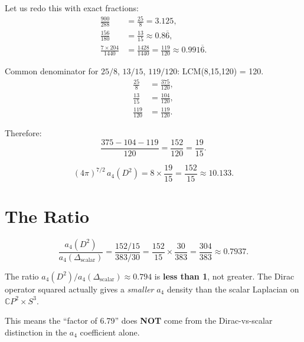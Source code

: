 \documentclass[12pt,a4paper]{article}
\theoremstyle{definition}
\begin{document}
Let us redo this with exact fractions:
\begin{align}
\frac{900}{288} &= \frac{25}{8} = 3.125, \\
\frac{156}{180} &= \frac{13}{15} \approx 0.8\overline{6}, \\
\frac{7 \times 204}{1440} &= \frac{1428}{1440} = \frac{119}{120}
  \approx 0.991\overline{6}.
\end{align}

Common denominator for $25/8$, $13/15$, $119/120$: LCM(8,15,120) = 120.
\begin{align}
\frac{25}{8} &= \frac{375}{120}, \\
\frac{13}{15} &= \frac{104}{120}, \\
\frac{119}{120} &= \frac{119}{120}.
\end{align}

Therefore:
\begin{equation}
\frac{375 - 104 - 119}{120} = \frac{152}{120} = \frac{19}{15}.
\end{equation}

\begin{equation}
\boxed{(4\pi)^{7/2}\,a_4(D^2) = 8 \times \frac{19}{15}
= \frac{152}{15} \approx 10.133.}
\end{equation}


\section{The Ratio}
\label{sec:ratio}

\begin{equation}\label{eq:ratio}
\boxed{\frac{a_4(D^2)}{a_4(\Delta_{\text{scalar}})}
= \frac{152/15}{383/30} = \frac{152}{15} \times \frac{30}{383}
= \frac{304}{383} \approx 0.7937.}
\end{equation}

\begin{tcolorbox}[colback=red!5!white, colframe=red!50!black,
title={\textbf{CRITICAL FINDING}}]
The ratio $a_4(D^2)/a_4(\Delta_{\text{scalar}}) \approx 0.794$ is
\textbf{less than 1}, not greater.  The Dirac operator squared
actually gives a \emph{smaller} $a_4$ density than the scalar
Laplacian on $\mathbb{C}P^2 \times S^3$.

This means the ``factor of 6.79'' does \textbf{NOT} come from the
Dirac-vs-scalar distinction in the $a_4$ coefficient alone.
\end{tcolorbox}
\end{document}

